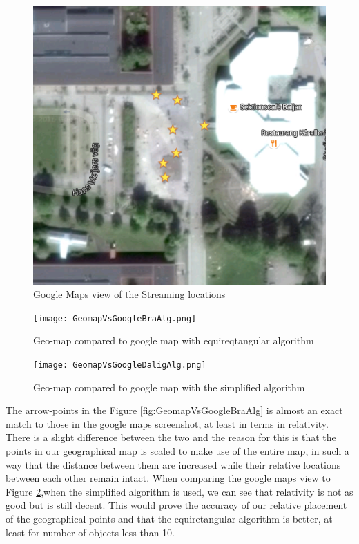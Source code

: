 \begin{figure}[ht!]
\begin{center}
	\includegraphics[scale=0.64]{Google_Maps.png}
	\caption{Google Maps view of the Streaming locations}
	\label{fig:googlemaps}
\end{center}
\end{figure}

\begin{figure}[!htb]
  \texttt{[image: GeomapVsGoogleBraAlg.png]}
  \caption{Geo-map compared to google map with equireqtangular algorithm}\label{fig:GeomapVsGoogleBraAlg}
\endminipage\hfill
\hspace{3px}
  \texttt{[image: GeomapVsGoogleDaligAlg.png]}
  \caption{Geo-map compared to google map with the simplified algorithm}\label{fig:GeomapVsGoogleDaligAlg}
\endminipage\hfill
\end{figure}

The arrow-points in the Figure \ref{fig:GeomapVsGoogleBraAlg} is almost an exact match to those in the google maps screenshot, at least in terms in relativity. There is a slight difference between the two and the reason for this is that the points in our geographical map is scaled to make use of the entire map, in such a way that the distance between them are increased while their relative locations between each other remain intact. When comparing the google maps view to Figure \ref{fig:GeomapVsGoogleDaligAlg},when the simplified algorithm is used, we can see that relativity is not as good but is still decent. This would prove the accuracy of our relative placement of the geographical points and that the equiretangular algorithm is better, at least for number of objects less than 10.

